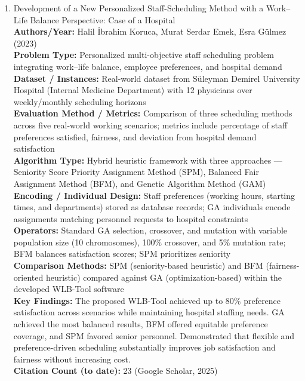 \documentclass[a4paper,12pt]{article}
\begin{document}
\begin{enumerate}[leftmargin=2em, labelwidth=1em, labelsep=0.5em, itemsep=1ex]
  \item Development of a New Personalized Staff-Scheduling Method with a Work–Life Balance Perspective: Case of a Hospital \\
    \textbf{Authors/Year:} Halil İbrahim Koruca, Murat Serdar Emek, Esra Gülmez (2023) \\  
    \textbf{Problem Type:} Personalized multi-objective staff scheduling problem integrating work–life balance, employee preferences, and hospital demand \\  
    \textbf{Dataset / Instances:} Real-world dataset from Süleyman Demirel University Hospital (Internal Medicine Department) with 12 physicians over weekly/monthly scheduling horizons \\  
    \textbf{Evaluation Method / Metrics:} Comparison of three scheduling methods across five real-world working scenarios; metrics include percentage of staff preferences satisfied, fairness, and deviation from hospital demand satisfaction \\  
    \textbf{Algorithm Type:} Hybrid heuristic framework with three approaches — Seniority Score Priority Assignment Method (SPM), Balanced Fair Assignment Method (BFM), and Genetic Algorithm Method (GAM) \\  
    \textbf{Encoding / Individual Design:} Staff preferences (working hours, starting times, and departments) stored as database records; GA individuals encode assignments matching personnel requests to hospital constraints \\  
    \textbf{Operators:} Standard GA selection, crossover, and mutation with variable population size (10 chromosomes), 100\% crossover, and 5\% mutation rate; BFM balances satisfaction scores; SPM prioritizes seniority \\  
    \textbf{Comparison Methods:} SPM (seniority-based heuristic) and BFM (fairness-oriented heuristic) compared against GA (optimization-based) within the developed WLB-Tool software \\  
    \textbf{Key Findings:} The proposed WLB-Tool achieved up to 80\% preference satisfaction across scenarios while maintaining hospital staffing needs. GA achieved the most balanced results, BFM offered equitable preference coverage, and SPM favored senior personnel. Demonstrated that flexible and preference-driven scheduling substantially improves job satisfaction and fairness without increasing cost. \\  
    \textbf{Citation Count (to date):} 23 (Google Scholar, 2025) \\[2ex]
  

\end{enumerate}
\end{document}
